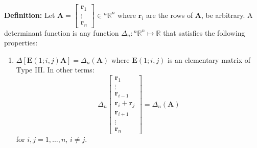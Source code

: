 \documentclass{article}
\newcommand{\bff}[1]{\mathbf{#1}}
\begin{document}
\begin{minipage}[t]{.45\linewidth}
        \textbf{Definition:} Let $\bff{A} = \begin{bmatrix}
            \bff{r}_1 \\ \vdots \\ \bff{r}_n
        \end{bmatrix} \in {^n}\mathbb{R}^n$ where $\bff{r}_i$ are the rows of $\bff{A}$, be arbitrary. A determinant function is any function $\Delta_n: {^n}\mathbb{R}^n \mapsto \mathbb{R}$ that satisfies the following properties:
        \vspace{2mm}

        \begin{enumerate}[label=D\Roman*]
            \item $\Delta[\bff{E}(1;i,j)\bff{A}]=\Delta_n(\bff{A})$ where $\bff{E}(1;i,j)$ is an elementary matrix of Type III. In other terms:
            \begin{equation*}
                \Delta_n\begin{bmatrix}
                    \bff{r}_1 \\ \vdots \\ \bff{r}_{i-1} \\ \bff{r}_i+\bff{r}_j \\ \bff{r}_{i+1} \\ \vdots \\ \bff{r}_n
                \end{bmatrix} = \Delta_n(\bff{A})
            \end{equation*}
            for $i,j=1,\dots, n$, $i\neq j$.
        \end{enumerate}
    \end{minipage}\hfill
\end{document}
